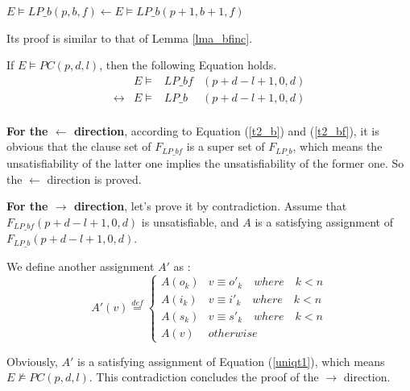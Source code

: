 \documentclass[journal]{IEEEtran}
\begin{document}
\begin{lemma}\label{lma_binc}
$E\vDash LP\_b(p,b,f)\gets E\vDash LP\_b(p+1,b+1,f)$
\end{lemma}

Its proof is similar to that of Lemma \ref{lma_bfinc}.

\begin{lemma}\label{lma_gets1}
If $E\vDash PC(p,d,l)$,
then the following Equation holds.
\begin{equation}\label{eq_gets1}
\begin{array}{llll}
&E\vDash& LP\_bf&(p+d-l+1,0,d) \\
\leftrightarrow&E\vDash& LP\_b&(p+d-l+1,0,d) \\
\end{array}
\end{equation}
\end{lemma}
\begin{IEEEproof}
\textbf{For the $\gets$ direction},
according to Equation (\ref{t2_b}) and (\ref{t2_bf}),
it is obvious that the clause set of $F_{LP\_bf}$ is a super set of $F_{LP\_b}$,
which means the unsatisfiability of the latter one implies the unsatisfiability of the former one.
So the $\gets$ direction is proved.

\textbf{For the $\to$ direction},
let's prove it by contradiction.
Assume that $F_{LP\_bf}(p+d-l+1,0,d)$ is unsatisfiable,
and $A$ is a satisfying assignment of $F_{LP\_b}(p+d-l+1,0,d)$.

We define another assignment $A'$ as :
\begin{equation}
A'(v) \overset{def}{=} \left\{ \begin{array}{ll}
A(o_{k}) & v\equiv o'_{k}\quad where\quad k<n \\
A(i_{k}) & v\equiv i'_{k}\quad where\quad k<n \\
A(s_{k}) & v\equiv s'_{k}\quad where\quad k<n \\
A(v) & otherwise
\end{array}
\right.
\end{equation}

Obviously,
$A'$ is a satisfying assignment of Equation (\ref{uniqt1}),
which means $E\nvDash PC(p,d,l)$.
This contradiction concludes the proof of the $\to$ direction.

\end{IEEEproof}
\end{document}
